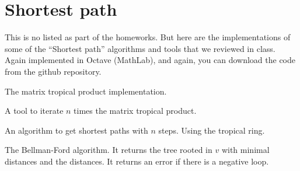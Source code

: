 \chapter{Shortest path}
\normalfont
This is no listed as part of the homeworks. But here are the implementations of some of the ``Shortest path'' algorithms and tools
that we reviewed in class. Again implemented in Octave (MathLab), and again, you can download the code from the github repository. \pn

The matrix tropical product implementation.
\ttfamily   

\normalfont

A tool to iterate $n$ times the matrix tropical product.
\ttfamily 

\normalfont

An algorithm to get shortest paths with $n$ steps. Using the tropical ring.
\ttfamily 

\normalfont

The Bellman-Ford algorithm. It returns the tree rooted in $v$ with minimal distances and the distances. 
It returns an error if there is a negative loop.
\ttfamily 

\normalfont

\itshape

